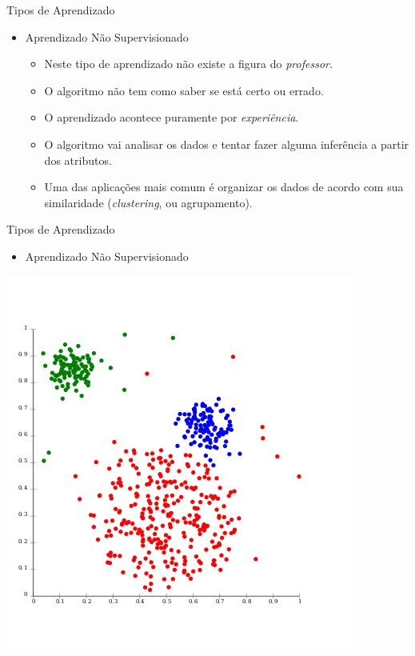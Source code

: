 \documentclass{libs/ufc_format}
\begin{document}
\begin{frame}{Tipos de Aprendizado}
    \begin{itemize}
        \item Aprendizado Não Supervisionado
            \begin{itemize}
                \justifying
                \item Neste tipo de aprendizado não existe a figura do \textit{professor}.
                \item<2-> O algoritmo não tem como saber se está certo ou errado.
                \item<3-> O aprendizado acontece puramente por \textit{experiência}.
                \item<4-> O algoritmo vai analisar os dados e tentar fazer alguma \alert<5>{inferência} a partir dos atributos.
                \item<5> Uma das aplicações mais comum é organizar os dados de acordo com sua similaridade (\textit{clustering}, ou agrupamento).
            \end{itemize}
    \end{itemize}
\end{frame}

\begin{frame}{Tipos de Aprendizado}
    \begin{itemize}
        \item Aprendizado Não Supervisionado
    \end{itemize}
    \centering
    \includegraphics[scale=0.45]{media/optics_gaussian_data}
\end{frame}
\end{document}
